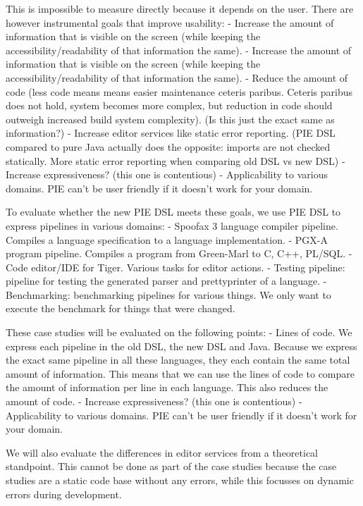 This is impossible to measure directly because it depends on the user.
There are however instrumental goals that improve usability:
- Increase the amount of information that is visible on the screen (while keeping the accessibility/readability of that information the same).
- Increase the amount of information that is visible on the screen (while keeping the accessibility/readability of that information the same).
- Reduce the amount of code (less code means means easier maintenance ceteris paribus. Ceteris paribus does not hold, system becomes more complex, but reduction in code should outweigh increased build system complexity). (Is this just the exact same as information?)
- Increase editor services like static error reporting. (PIE DSL compared to pure Java actually does the opposite: imports are not checked statically. More static error reporting when comparing old DSL vs new DSL)
- Increase expressiveness? (this one is contentious)
- Applicability to various domains. PIE can't be user friendly if it doesn't work for your domain.

To evaluate whether the new PIE DSL meets these goals, we use PIE DSL to express pipelines in various domains:
- Spoofax 3 language compiler pipeline. Compiles a language specification to a language implementation.
- PGX-A program pipeline. Compiles a program from Green-Marl to C, C++, PL/SQL.
- Code editor/IDE for Tiger. Various tasks for editor actions.
- Testing pipeline: pipeline for testing the generated parser and prettyprinter of a language.
- Benchmarking: benchmarking pipelines for various things. We only want to execute the benchmark for things that were changed.

These case studies will be evaluated on the following points:
- Lines of code. We express each pipeline in the old DSL, the new DSL and Java. Because we express the exact same pipeline in all these languages, they each contain the same total amount of information. This means that we can use the lines of code to compare the amount of information per line in each language. This also reduces the amount of code.
- Increase expressiveness? (this one is contentious)
- Applicability to various domains. PIE can't be user friendly if it doesn't work for your domain.

We will also evaluate the differences in editor services from a theoretical standpoint. This cannot be done as part of the case studies because the case studies are a static code base without any errors, while this focusses on dynamic errors during development.


